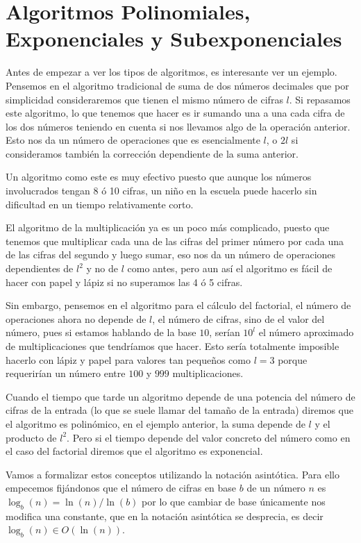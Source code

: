 \hfill
\section{Algoritmos Polinomiales, Exponenciales y Subexponenciales}

Antes de empezar a ver los tipos de algoritmos, es interesante ver un ejemplo. Pensemos en el algoritmo tradicional de suma de dos n\'umeros decimales que por simplicidad
consideraremos que tienen el mismo n\'umero de cifras $l$. Si repasamos este algoritmo, lo que tenemos que hacer es ir sumando una a una cada cifra de los dos n\'umeros teniendo
en cuenta si nos llevamos algo de la operaci\'on anterior. Esto nos da un n\'umero de operaciones que es esencialmente $l$, o $2l$ si consideramos tambi\'en la correcci\'on dependiente
de la suma anterior.

Un algoritmo como este es muy efectivo puesto que aunque los n\'umeros involucrados tengan 8 \'o 10 cifras, un ni\~no en la escuela puede hacerlo sin dificultad en un tiempo relativamente corto.

El algoritmo de la multiplicaci\'on ya es un poco m\'as complicado, puesto que tenemos que multiplicar cada una de las cifras del primer n\'umero por cada una de las cifras del segundo
y luego sumar, eso nos da un n\'umero de operaciones dependientes de $l^2$ y no de $l$ como antes, pero aun as\'i el algoritmo es f\'acil de hacer con papel y l\'apiz si no superamos
las 4 \'o 5 cifras.

Sin embargo, pensemos en el algoritmo para el c\'alculo del factorial, el n\'umero de operaciones ahora no depende de $l$, el número de cifras, sino de el valor del n\'umero, pues si estamos hablando de la base $10$, ser\'ian
$10^l$ el n\'umero aproximado de multiplicaciones que tendr\'iamos que hacer. Esto ser\'ia totalmente imposible hacerlo con l\'apiz y papel para valores tan peque\~nos como $l = 3$
porque requerir\'ian un n\'umero entre $100$ y $999$ multiplicaciones.

Cuando el tiempo que tarde un algoritmo depende de una potencia del n\'umero de cifras de la entrada (lo que se suele llamar del tama\~no de la entrada) diremos que el algoritmo es polin\'omico, en el ejemplo anterior, la suma depende de $l$ y el producto de $l^2$.
Pero si el tiempo depende del valor concreto del n\'umero como en el caso del factorial diremos que el algoritmo es exponencial.

Vamos a formalizar estos conceptos utilizando la notaci\'on asint\'otica. Para ello empecemos fij\'andonos que el n\'umero de cifras en base $b$ de un n\'umero $n$ es
$\log_b(n) = \ln(n)/\ln(b)$ por lo que cambiar de base \'unicamente nos modifica una constante, que en la notaci\'on asint\'otica se desprecia, es decir $\log_b(n) \in O(\ln(n))$.

